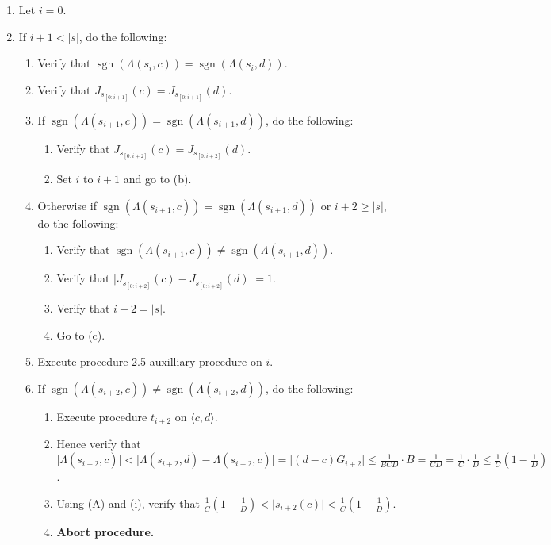 \documentclass{article}
\DeclareMathOperator{\sgn}{sgn}
\newcounter{procedure}[part]
\begin{document}
\begin{multicols}{2}
\begin{enumerate}
\begin{enumerate}
						\item Let $i=0$.
						\item If $i+1<\lvert s\rvert$, do the following:
						\begin{enumerate}
							\item Verify that $\sgn(\Lambda(s_i,c))=\sgn(\Lambda(s_i,d))$.
							\item Verify that $J_{s_{[0:i+1]}}(c)=J_{s_{[0:i+1]}}(d)$.
							\item If $\sgn(\Lambda(s_{i+1},c))=\sgn(\Lambda(s_{i+1},d))$, do the following:
							\begin{enumerate}
								\item Verify that $J_{s_{[0:i+2]}}(c)=J_{s_{[0:i+2]}}(d)$.
								\item Set $i$ to $i+1$ and go to (b).
							\end{enumerate}
							\item Otherwise if $\sgn(\Lambda(s_{i+1},c))=\sgn(\Lambda(s_{i+1},d))$ or $i+2\ge\lvert s\rvert$, do the following:
							\begin{enumerate}
								\item Verify that $\sgn(\Lambda(s_{i+1},c))\ne\sgn(\Lambda(s_{i+1},d))$.
								\item Verify that $\lvert J_{s_{[0:i+2]}}(c)-J_{s_{[0:i+2]}}(d)\rvert=1$.
								\item Verify that $i+2=\lvert s\rvert$.
								\item Go to (c).
							\end{enumerate}
							\item Execute \hyperref[sec:procedure 2.5 auxilliary procedure]{procedure 2.5 auxilliary procedure} on $i$.
							\item If $\sgn(\Lambda(s_{i+2},c))\ne\sgn(\Lambda(s_{i+2},d))$, do the following:
							\begin{enumerate}
								\item Execute procedure $t_{i+2}$ on $\langle c,d\rangle$.
								\item Hence verify that $\lvert\Lambda(s_{i+2},c)\rvert<\lvert\Lambda(s_{i+2},d)-\Lambda(s_{i+2},c)\rvert=\lvert (d-c)G_{i+2}\rvert\le\frac{1}{BCD}\cdot B=\frac{1}{CD}=\frac{1}{C}\cdot\frac{1}{D}\le\frac{1}{C}(1-\frac{1}{D})$.
								\item Using (A) and (i), verify that $\frac{1}{C}(1-\frac{1}{D})<\lvert s_{i+2}(c)\rvert<\frac{1}{C}(1-\frac{1}{D})$.
								\item \textbf{Abort procedure.}
							\end{enumerate}

\end{enumerate}
\end{enumerate}
\end{enumerate}
\end{multicols}
\end{document}
